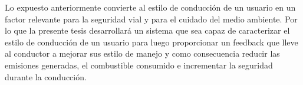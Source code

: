 \begin{introduction}
 Lo expuesto anteriormente convierte al estilo de conducción de un usuario en un factor relevante para la seguridad vial y para el cuidado del medio ambiente. Por lo que la presente tesis desarrollará un sistema que sea capaz de caracterizar el estilo de conducción de un usuario para luego proporcionar un feedback que lleve al conductor a mejorar sus estilo de manejo y como consecuencia reducir las emisiones generadas, el combustible consumido e incrementar la seguridad durante la conducción.


\end{introduction}
